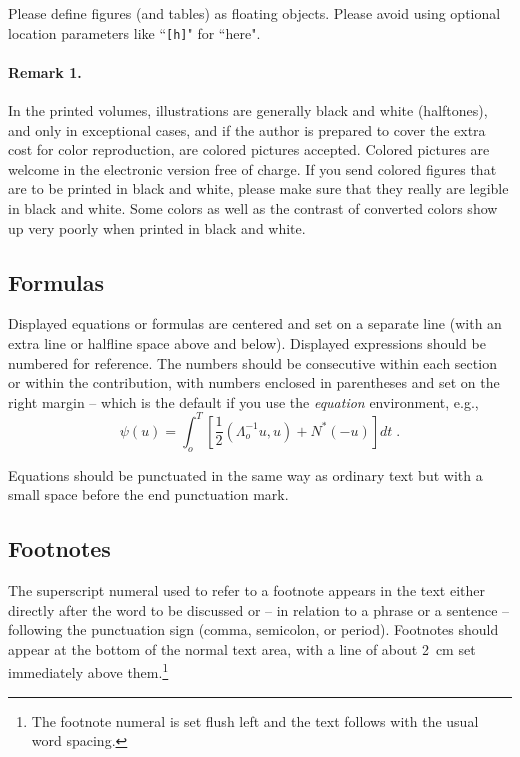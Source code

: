 \documentclass[runningheads,a4paper]{llncs}
\begin{document}
{Please define figures (and tables) as floating objects. Please avoid
using optional location parameters like ``\verb+[h]+" for ``here".

\paragraph{Remark 1.}

In the printed volumes, illustrations are generally black and white
(halftones), and only in exceptional cases, and if the author is
prepared to cover the extra cost for color reproduction, are colored
pictures accepted. Colored pictures are welcome in the electronic
version free of charge. If you send colored figures that are to be
printed in black and white, please make sure that they really are
legible in black and white. Some colors as well as the contrast of
converted colors show up very poorly when printed in black and white.

\subsection{Formulas}

Displayed equations or formulas are centered and set on a separate
line (with an extra line or halfline space above and below). Displayed
expressions should be numbered for reference. The numbers should be
consecutive within each section or within the contribution,
with numbers enclosed in parentheses and set on the right margin --
which is the default if you use the \emph{equation} environment, e.g.,
\begin{equation}
  \psi (u) = \int_{o}^{T} \left[\frac{1}{2}
  \left(\Lambda_{o}^{-1} u,u\right) + N^{\ast} (-u)\right] dt \;  .
\end{equation}

Equations should be punctuated in the same way as ordinary
text but with a small space before the end punctuation mark.

\subsection{Footnotes}

The superscript numeral used to refer to a footnote appears in the text
either directly after the word to be discussed or -- in relation to a
phrase or a sentence -- following the punctuation sign (comma,
semicolon, or period). Footnotes should appear at the bottom of
the
normal text area, with a line of about 2~cm set
immediately above them.\footnote{The footnote numeral is set flush left
and the text follows with the usual word spacing.}

}
\end{document}

